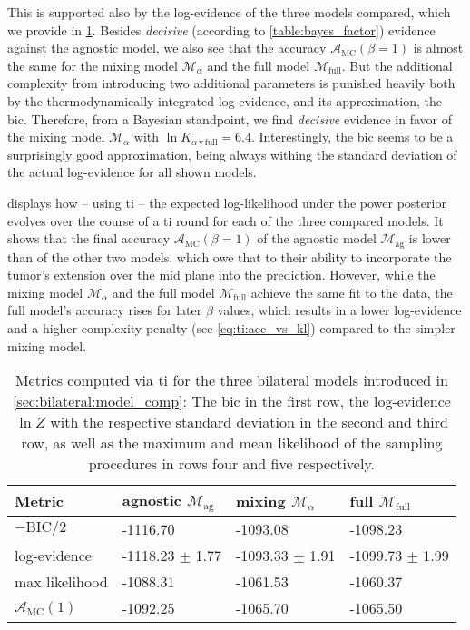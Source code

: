 \documentclass[\relativeRoot/main.tex]{subfiles}
\begin{document}
This is supported also by the log-evidence of the three models compared, which we provide in \cref{table:bilateral:model_comp:evidences}. Besides \emph{decisive} (according to \cref{table:bayes_factor}) evidence against the agnostic model, we also see that the accuracy $\mathcal{A}_\text{MC}(\beta=1)$ is almost the same for the mixing model $\mathcal{M}_\alpha$ and the full model $\mathcal{M}_\text{full}$. But the additional complexity from introducing two additional parameters is punished heavily both by the thermodynamically integrated log-evidence, and its approximation, the \gls{bic}. Therefore, from a Bayesian standpoint, we find \emph{decisive} evidence in favor of the mixing model $\mathcal{M}_\alpha$ with $\ln{K}_{\alpha\,\text{v}\,\text{full}} = 6.4$. Interestingly, the \gls{bic} seems to be a surprisingly good approximation, being always withing the standard deviation of the actual log-evidence for all shown models.

 displays how -- using \gls{ti} -- the expected log-likelihood under the power posterior evolves over the course of a \gls{ti} round for each of the three compared models. It shows that the final accuracy $\mathcal{A}_\text{MC}(\beta=1)$ of the agnostic model $\mathcal{M}_\text{ag}$ is lower than of the other two models, which owe that to their ability to incorporate the tumor's extension over the mid plane into the prediction. However, while the mixing model $\mathcal{M}_\alpha$ and the full model $\mathcal{M}_\text{full}$ achieve the same fit to the data, the full model's accuracy rises for later $\beta$ values, which results in a lower log-evidence and a higher complexity penalty (see \cref{eq:ti:acc_vs_kl}) compared to the simpler mixing model.

\begin{table}
    \centering
    \begin{tabular}{|l|l|l|l|}
        \hline
        \textbf{Metric} & \textbf{agnostic} $\mathcal{M}_\text{ag}$ & \textbf{mixing} $\mathcal{M}_\alpha$ & \textbf{full} $\mathcal{M}_\text{full}$ \\
        \hline
        $-\text{BIC}/2$ & -1116.70 & -1093.08 & -1098.23 \\
        log-evidence & -1118.23 $\pm$ 1.77 & -1093.33 $\pm$ 1.91 & -1099.73 $\pm$ 1.99 \\
        max likelihood & -1088.31 & -1061.53 & -1060.37 \\
        $\mathcal{A}_\text{MC}(1)$ & -1092.25 & -1065.70 & -1065.50 \\
        \hline
    \end{tabular}
    \caption[Metrics for assessing three bilateral models]{Metrics computed via \gls{ti} for the three bilateral models introduced in \cref{sec:bilateral:model_comp}: The \gls{bic} in the first row, the log-evidence $\ln{Z}$ with the respective standard deviation in the second and third row, as well as the maximum and mean likelihood of the sampling procedures in rows four and five respectively.}
    \label{table:bilateral:model_comp:evidences}
\end{table}
\end{document}
